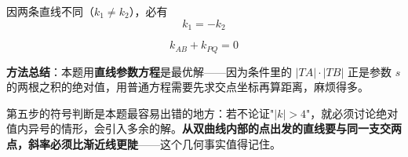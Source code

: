 \begin{answer}
因两条直线不同（$k_1\ne k_2$），必有
\nopagebreak[4]
\[k_1=-k_2\]

\nopagebreak[4]
\[k_{AB}+k_{PQ}=0\]

\begin{gktip}
\textbf{方法总结}：本题用\textbf{直线参数方程}是最优解——因为条件里的 $|TA|\cdot|TB|$ 正是参数 $s$ 的两根之积的绝对值，用普通方程需要先求交点坐标再算距离，麻烦得多。

第五步的符号判断是本题最容易出错的地方：若不论证"$|k|>4$"，就必须讨论绝对值内异号的情形，会引入多余的解。\textbf{从双曲线内部的点出发的直线要与同一支交两点，斜率必须比渐近线更陡}——这个几何事实值得记住。
\end{gktip}



\par\medskip

\end{answer}
